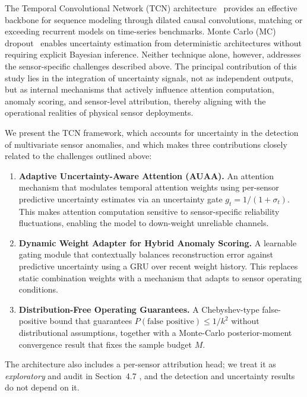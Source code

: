 The Temporal Convolutional Network (TCN) architecture~\cite{bai2018tcn} provides an effective backbone for sequence modeling through dilated causal convolutions, matching or exceeding recurrent models on time-series benchmarks. Monte Carlo (MC) dropout~\cite{gal2016dropout_bayesian} enables uncertainty estimation from deterministic architectures without requiring explicit Bayesian inference. Neither technique alone, however, addresses the sensor-specific challenges described above. The principal contribution of this study lies in the integration of uncertainty signals, not as independent outputs, but as internal mechanisms that actively influence attention computation, anomaly scoring, and sensor-level attribution, thereby aligning with the operational realities of physical sensor deployments.

We present the TCN framework, which accounts for uncertainty in the detection of multivariate sensor anomalies, and which makes three contributions closely related to the challenges outlined above:

\begin{enumerate}[leftmargin=*, nosep]
    \item \textbf{Adaptive Uncertainty-Aware Attention (AUAA).} An attention mechanism that modulates temporal attention weights using per-sensor predictive uncertainty estimates via an uncertainty gate $g_t = 1/(1 + \sigma_t)$. This makes attention computation sensitive to sensor-specific reliability fluctuations, enabling the model to down-weight unreliable channels.
    
    \item \textbf{Dynamic Weight Adapter for Hybrid Anomaly Scoring.} A learnable gating module that contextually balances reconstruction error against predictive uncertainty using a GRU over recent weight history. This replaces static combination weights with a mechanism that adapts to sensor operating conditions.
    
    \item \textbf{Distribution-Free Operating Guarantees.} A Chebyshev-type false-positive bound that guarantees $P(\text{false positive}) \leq 1/k^2$ without distributional assumptions, together with a Monte-Carlo posterior-moment convergence result that fixes the sample budget $M$.
\end{enumerate}

\noindent The architecture also includes a per-sensor attribution head; we treat it as \emph{exploratory} and audit in Section~4.7 , and the detection and uncertainty results do not depend on it.

